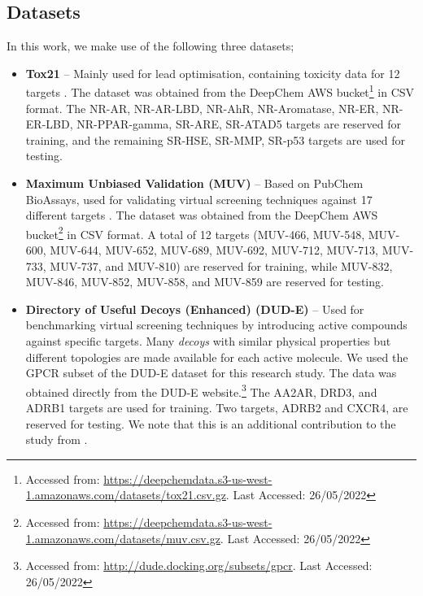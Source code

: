\subsection{Datasets}

In this work, we make use of the following three datasets;

\begin{itemize}
    
    \item \textbf{Tox21} \citep{huang2016tox21challenge} -- Mainly used for lead optimisation, containing toxicity data for 12 targets \citep{tox21}. The dataset was obtained from the DeepChem AWS bucket\footnote{Accessed from: \url{https://deepchemdata.s3-us-west-1.amazonaws.com/datasets/tox21.csv.gz}. Last Accessed: 26/05/2022} in CSV format. The NR-AR, NR-AR-LBD, NR-AhR, NR-Aromatase, NR-ER, NR-ER-LBD, NR-PPAR-gamma, SR-ARE, SR-ATAD5 targets are reserved for training, and the remaining SR-HSE, SR-MMP, SR-p53 targets are used for testing.
    
    \item \textbf{Maximum Unbiased Validation (MUV)} \citep{rohrer2009maximum} -- Based on PubChem BioAssays, used for validating virtual screening techniques against 17 different targets \citep{rohrer2009maximum}. The dataset was obtained from the DeepChem AWS bucket\footnote{Accessed from: \url{https://deepchemdata.s3-us-west-1.amazonaws.com/datasets/muv.csv.gz}. Last Accessed: 26/05/2022} in CSV format. A total of 12 targets (MUV-466, MUV-548, MUV-600, MUV-644, MUV-652, MUV-689, MUV-692, MUV-712, MUV-713, MUV-733, MUV-737, and MUV-810) are reserved for training, while MUV-832, MUV-846, MUV-852, MUV-858, and MUV-859 are reserved for testing.
    
    \item \textbf{Directory of Useful Decoys (Enhanced) (DUD-E)} \cite{mysinger2012directory} -- Used for benchmarking virtual screening techniques by introducing active compounds against specific targets. Many \textit{decoys} with similar physical properties but different topologies are made available for each active molecule. We used the GPCR subset of the DUD-E dataset \citep{mysinger2012directory} for this research study. The data was obtained directly from the DUD-E website.\footnote{Accessed from: \url{http://dude.docking.org/subsets/gpcr}. Last Accessed: 26/05/2022} The AA2AR, DRD3, and ADRB1 targets are used for training. Two targets, ADRB2 and CXCR4, are reserved for testing. We note that this is an additional contribution to the study from \citet{altae2017low}.
\end{itemize}

